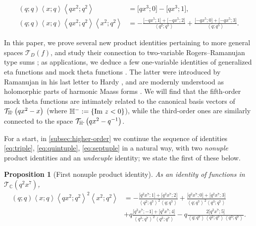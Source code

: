\documentclass[reqno,11pt]{amsart}
\newtheorem{proposition}[theorem]{Proposition}
\theoremstyle{definition}
\theoremstyle{remark}
\numberwithin{equation}{section}
\newcommand{\C}{\mathbb{C}}
\renewcommand{\H}{{\mathbb{H}}}
\newcommand{\Hminus}{{\mathbb{H}^{\textnormal{-}\hspace{-0.03cm}}}}
\newcommand{\mT}{\mathcal{T}}
\renewcommand{\Im}{\textnormal{Im}\ }
\newcommand{\la}{\left\langle}
\newcommand{\ra}{\right\rangle}
\newcommand{\vect}[2]{\big[{#1};{#2}\big]}
\begin{document}
\begin{align}
    (q; q)\la x; q \ra \la qx^2; q^2 \ra &=  
    \vect{qx^3}{0} - \vect{qx^3}{1}
    \label{eq:quintuple}, \\[4pt]
    (q; q) \la x; q \ra \la qx^2; q^2 \ra \la x^2; q^2 \ra &= - \frac{\vect{-qx^5}{1} + \vect{-qx^5}{2}}{\la q^2; q^5 \ra} + \frac{\vect{-qx^5}{0} + \vect{-qx^5}{3}}{\la q; q^5 \ra}. 
    \label{eq:septuple}
\end{align}

In this paper, we prove several new product identities pertaining to more general spaces $\mT_D(f)$, and study their connection to two-variable Rogers--Ramanujan type sums \cite{sills2007identities}; as applications, we deduce a few one-variable identities of generalized eta functions \cite{yang2004transformation} and mock theta functions \cite{ramanujan1988lost,andrews1989ramanujan}. The latter were introduced by Ramanujan in his last letter to Hardy \cite{ramanujan1988lost}, and are modernly understood as holomorphic parts of harmonic Maass forms \cite{bringmann2017harmonic}. %
We will find that the fifth-order mock theta functions are intimately related to the canonical basis vectors of $\mT_\Hminus\left(qx^2 - x\right)$ (where $\H^- := \{\Im z < 0\}$), while the third-order ones are similarly connected to the space $\mT_\Hminus\left(qx^2 - q^{-1}\right)$.%

For a start, in \cref{subsec:higher-order} we continue the sequence of identities \cref{eq:triple}, \cref{eq:quintuple}, \cref{eq:septuple} in a natural way, with two \emph{nonuple} product identities and an \emph{undecuple} identity; we state the first of these below.

\begin{proposition}[First nonuple product identity] \label{prop:nonuple}
As an identity of functions in $\mT_\C\left(q^2x^7\right)$,
\begin{equation} \label{eq:nonuple}
\begin{split}
    (q;q) \la x; q \ra \la qx^2; q^2 \ra^2 \la x^2; q^2 \ra
    &=
    - \frac{\vect{q^2x^7}{1} + \vect{q^2x^7}{2}}{\la q^2 ; q^7 \ra^2 \la q; q^7\ra}
    +
    \frac{\vect{q^2x^7}{0} + \vect{q^2x^7}{3}}{\la q ; q^7 \ra^2 \la q^3; q^7\ra}
    \\[4pt]
    &
    + 
    q\frac{\vect{q^2x^7}{-1} + \vect{q^2x^7}{4}}{\la q^3 ; q^7 \ra^2 \la q^2; q^7\ra} 
    - 
    q\frac{2\vect{q^2x^7}{5}}{\la q; q^7\ra \la q^2; q^7 \ra \la q^3; q^7 \ra }.
\end{split}
\end{equation}
\end{proposition}
\end{document}
